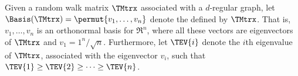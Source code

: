 \begin {defn} Given a random walk matrix $\TMtrx $ associated with a $d$-regular graph, let $\Basis (\TMtrx )= \permut {v_1,\ldots , v_n}$ denote the  defined by $\TMtrx $. That is, $v_1,\ldots , v_n$ is an orthonormal basis for $\Re ^n$, where all these vectors are eigenvectors of $\TMtrx $ and $v_1= 1^n/\sqrt {n}$. Furthermore, let $\TEV {i}$ denote the $i$th eigenvalue of $\TMtrx $, associated with the eigenvector $v_i$, such that $\TEV {1} \geq \TEV {2} \geq \cdots \geq \TEV {n}$. \par {} \end {defn}
